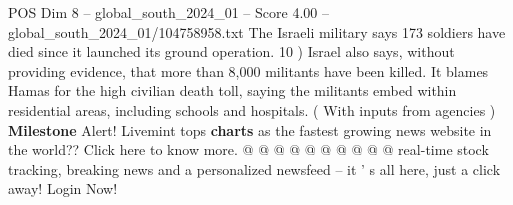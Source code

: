 \begin{textsample}{POS Dim 8 – global\_south\_2024\_01 – Score 4.00 – global\_south\_2024\_01/104758958.txt}
The Israeli military says 173 soldiers have died since it launched its ground operation. 10 ) Israel also says, without providing evidence, that more than 8,000 militants have been killed.
It blames Hamas for the high civilian death toll, saying the militants embed within residential areas, including schools and hospitals. ( With inputs from agencies ) \textbf{Milestone} Alert!
Livemint tops \textbf{charts} as the fastest growing news website in the world??
Click here to know more. @ @ @ @ @ @ @ @ @ @ real-time stock tracking, breaking news and a personalized newsfeed -- it ' s all here, just a click away!
Login Now!

\end{textsample}
